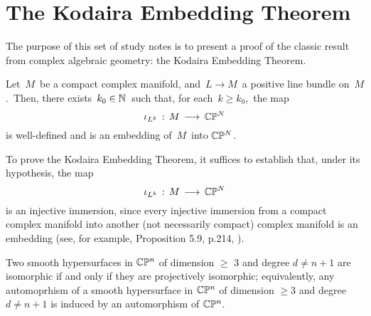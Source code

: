 

\section{The Kodaira Embedding Theorem}
\setcounter{theorem}{0}
\setcounter{equation}{0}


\renewcommand{\theenumi}{\roman{enumi}}
\renewcommand{\labelenumi}{\textnormal{(\theenumi)}$\;\;$}


The purpose of this set of study notes is to present a proof
of the classic result from complex algebraic geometry:
the Kodaira Embedding Theorem.

\begin{theorem}
\mbox{}
\vskip 0.1cm
\noindent
Let \,$M$\, be a compact complex manifold,
and \,$L \longrightarrow M$\, a positive line bundle on \,$M$.\,
Then, there exists \,$k_{0} \in \mathbb{N}$\, such that, for each \,$k \geq k_{0}$,\,
the map
\begin{equation*}
\iota_{L^{k}} \, : \, M \, \longrightarrow \, \mathbb{C}\mathbb{P}^{N}
\end{equation*}
is well-defined and is an embedding of \,$M$\, into $\mathbb{C}\mathbb{P}^{N}$.
\end{theorem}


\begin{remark}
\mbox{}
\vskip 0.1cm
\noindent
To prove the Kodaira Embedding Theorem, it suffices to establish that,
under its hypothesis, the map
\begin{equation*}
\iota_{L^{k}} \, : \, M \, \longrightarrow \, \mathbb{C}\mathbb{P}^{N}
\end{equation*}
is an injective immersion, since every injective immersion from a compact complex manifold
into another (not necessarily compact) complex manifold is an embedding
(see, for example, Proposition 5.9, p.214, \cite{FritzscheGrauert2002}).
\end{remark}


\begin{theorem}
\mbox{}
\vskip 0.1cm
\noindent
Two smooth hypersurfaces in $\mathbb{C}\mathbb{P}^{n}$
of dimension $\geq$ $3$ and degree $d \neq n + 1$
are isomorphic if and only if they are projectively isomorphic;
equivalently, any automoprhism of a smooth hypersurface
in $\mathbb{C}\mathbb{P}^{n}$ of dimension $\geq 3$ and degree $d \neq n+ 1$
is induced by an automorphism of $\mathbb{C}\mathbb{P}^{n}$.
\end{theorem}

